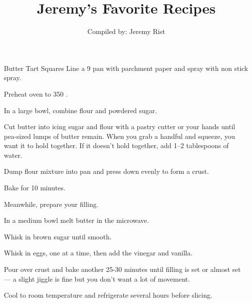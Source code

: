 \documentclass[letterpaper]{book}
\title{Jeremy's Favorite Recipes}
\author{Compiled by: Jeremy Rist}
\begin{document}
\maketitle

\begin{recipe}{Butter Tart Squares}{}{}
    \newstep
    Line a 9 pan with parchment paper and spray with non stick spray.

    Preheat oven to 350\0 .

    In a large bowl, combine flour and powdered sugar.

    Cut butter into icing sugar and flour with a pastry cutter or your hands until pea-sized lumps of butter remain.
    When you grab a handful and squeeze, you want it to hold together.
    If it doesn't hold together, add 1--2 tablespoons of water.

    \newstep
    Dump flour mixture into pan and press down evenly to form a crust.

    Bake for 10 minutes.

    Meanwhile, prepare your filling.

    In a medium bowl melt butter in the microwave.

    Whisk in brown sugar until smooth.

    Whisk in eggs, one at a time, then add the vinegar and vanilla.

    \newstep
    Pour over crust and bake another 25-30 minutes until filling is set or almost set --- a slight jiggle is fine but you don't want a lot of movement.

    Cool to room temperature and refrigerate several hours before slicing.
\end{recipe}
\end{document}

